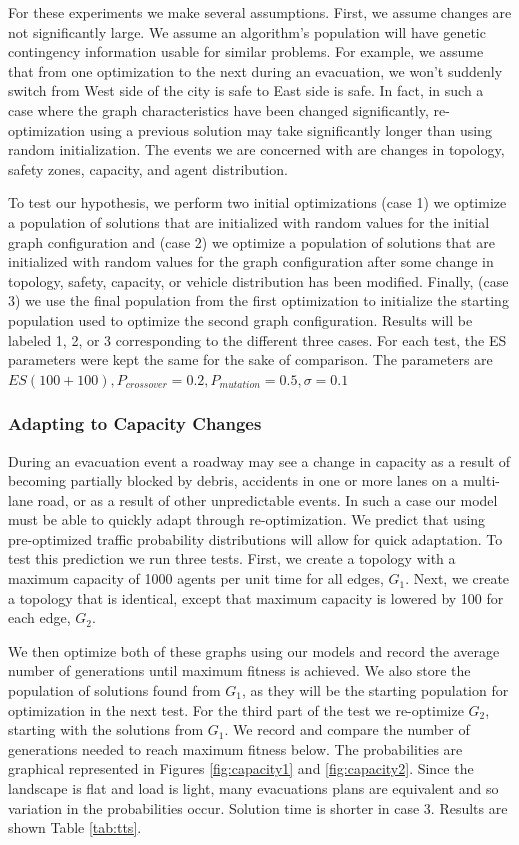 \documentclass{sig-alternate-05-2015}
\begin{document}
For these experiments we make several assumptions.  First, we assume
changes are not significantly large.  We assume an algorithm's
population will have genetic contingency information usable for
similar problems.  For example, we assume that from one optimization
to the next during an evacuation, we won't suddenly switch from West
side of the city is safe to East side is safe.  In fact, in such a
case where the graph characteristics have been changed significantly,
re-optimization using a previous solution may take significantly
longer than using random initialization.  The events we are concerned
with are changes in topology, safety zones, capacity, and agent
distribution.

To test our hypothesis, we perform two initial optimizations (case 1)
we optimize a population of solutions that are initialized with random
values for the initial graph configuration and (case 2) we optimize a
population of solutions that are initialized with random values for
the graph configuration after some change in topology, safety,
capacity, or vehicle distribution has been modified.  Finally, (case
3) we use the final population from the first optimization to
initialize the starting population used to optimize the second graph
configuration.  Results will be labeled 1, 2, or 3 corresponding to
the different three cases.  For each test, the ES parameters
were kept the same for the sake of comparison.  The parameters are
$ES(100+100), P_{crossover}=0.2, P_{mutation}=0.5, \sigma=0.1$

\subsubsection{Adapting to Capacity Changes}
During an evacuation event a roadway may see a change in capacity as a
result of becoming partially blocked by debris, accidents in one or
more lanes on a multi-lane road, or as a result of other unpredictable
events.  In such a case our model must be able to quickly adapt
through re-optimization.  We predict that using pre-optimized traffic
probability distributions will allow for quick adaptation.  To test
this prediction we run three tests.  First, we create a topology with
a maximum capacity of 1000 agents per unit time for all edges,
$G_1$.  Next, we create a topology that is identical, except that
maximum capacity is lowered by 100 for each edge, $G_2$.

We then optimize both of these graphs using our models and record the
average number of generations until maximum fitness is achieved.  We
also store the population of solutions found from $G_1$, as they will
be the starting population for optimization in the next test.  For the
third part of the test we re-optimize $G_2$, starting with the
solutions from $G_1$.  We record and compare the number of generations
needed to reach maximum fitness below.  The probabilities are
graphical represented in Figures \ref{fig:capacity1} and
\ref{fig:capacity2}.  Since the landscape is flat and load is light,
many evacuations plans are equivalent and so variation in the
probabilities occur.  Solution time is shorter in case 3.  Results are
shown Table \ref{tab:tts}.
\end{document}
